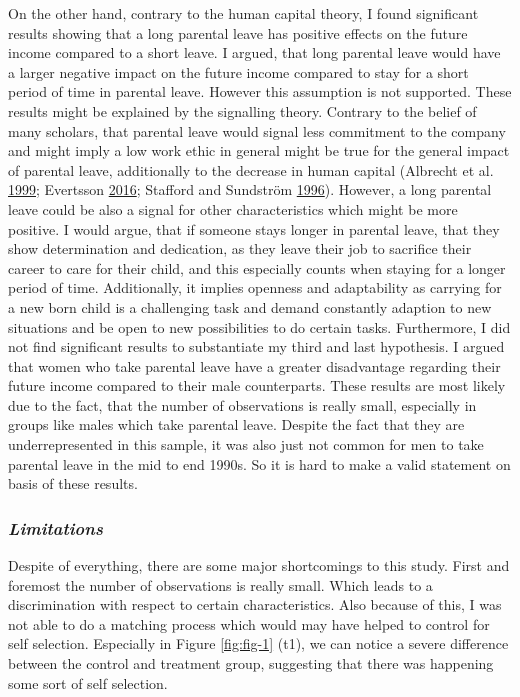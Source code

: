 \documentclass[
  12pt,
]{article}
\begin{document}
On the other hand, contrary to the human capital theory, I found significant results showing that a long parental leave has positive effects on the future income compared to a short leave.
I argued, that long parental leave would have a larger negative impact on the future income compared to stay for a short period of time in parental leave. However this assumption is not supported.
These results might be explained by the signalling theory. Contrary to the belief of many scholars, that parental leave would signal less commitment to the company and might imply a low work ethic in general might be true for the general impact of parental leave, additionally to the decrease in human capital (Albrecht et al. \protect\hyperlink{ref-albrecht_career_1999}{1999}; Evertsson \protect\hyperlink{ref-evertsson_parental_2016}{2016}; Stafford and Sundström \protect\hyperlink{ref-stafford_time_1996}{1996}). However, a long parental leave could be also a signal for other characteristics which might be more positive. I would argue, that if someone stays longer in parental leave, that they show determination and dedication, as they leave their job to sacrifice their career to care for their child, and this especially counts when staying for a longer period of time. Additionally, it implies openness and adaptability as carrying for a new born child is a challenging task and demand constantly adaption to new situations and be open to new possibilities to do certain tasks.
Furthermore, I did not find significant results to substantiate my third and last hypothesis. I argued that women who take parental leave have a greater disadvantage regarding their future income compared to their male counterparts. These results are most likely due to the fact, that the number of observations is really small, especially in groups like males which take parental leave. Despite the fact that they are underrepresented in this sample, it was also just not common for men to take parental leave in the mid to end 1990s.
So it is hard to make a valid statement on basis of these results.

\hypertarget{limitations-1}{%
\subsubsection*{\texorpdfstring{\emph{Limitations}}{Limitations}}\label{limitations-1}}

Despite of everything, there are some major shortcomings to this study. First and foremost the number of observations is really small. Which leads to a discrimination with respect to certain characteristics. Also because of this, I was not able to do a matching process which would may have helped to control for self selection. Especially in Figure \ref{fig:fig-1} (t1), we can notice a severe difference between the control and treatment group, suggesting that there was happening some sort of self selection.
\end{document}
